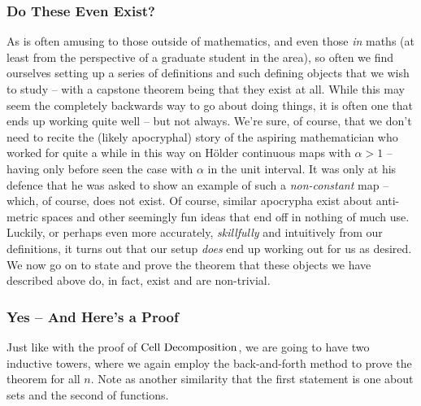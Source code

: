 \subsubsection{Do These Even Exist?}

As is often amusing to those outside of mathematics, and even those \emph{in} maths (at least from the perspective of a graduate student in the area), so often we find ourselves setting up a series of definitions and such defining objects that we wish to study -- with a capstone theorem being that they exist at all. While this may seem the completely backwards way to go about doing things, it is often one that ends up working quite well -- but not always. We're sure, of course, that we don't need to recite the (likely apocryphal) story of the aspiring mathematician who worked for quite a while in this way on H\"older continuous maps with $\alpha > 1$ -- having only before seen the case with $\alpha$ in the unit interval. It was only at his defence that he was asked to show an example of such a \emph{non-constant} map -- which, of course, does not exist. Of course, similar apocrypha exist about anti-metric spaces and other seemingly fun ideas that end off in nothing of much use. Luckily, or perhaps even more accurately, \emph{skillfully} and intuitively from our definitions, it turns out that our setup \emph{does} end up working out for us as desired. We now go on to state and prove the theorem that these objects we have described above do, in fact, exist and are non-trivial.

\subsubsection{Yes -- And Here's a Proof}

Just like with the proof of $\textrm{Cell Decomposition}$, we are going to have two inductive towers, where we again employ the back-and-forth method to prove the theorem for all $n$. Note as another similarity that the first statement is one about sets and the second of functions.

